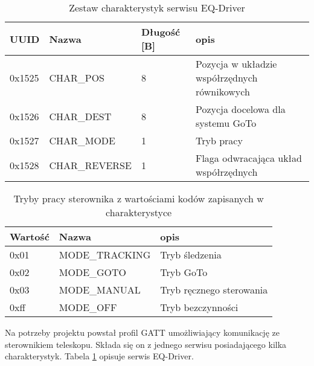 \begin{table}[t]

\begin{tabularx}{\linewidth}{|l|l|l|X|}

\hline UUID & Nazwa & Długość [B] & opis \\

\hline 0x1525 & CHAR\_POS & 8 & Pozycja w układzie współrzędnych równikowych \\

\hline 0x1526 & CHAR\_DEST & 8 & Pozycja docelowa dla systemu GoTo \\

\hline 0x1527 & CHAR\_MODE & 1 & Tryb pracy \\

\hline 0x1528 & CHAR\_REVERSE & 1 & Flaga odwracająca układ współrzędnych \\

\hline \end{tabularx}

\caption{Zestaw charakterystyk serwisu EQ-Driver}

\label{tab:eq-driver-service}

\end{table}

\begin{table}[t]

\begin{tabularx}{\linewidth}{|l|l|X|}

\hline Wartość & Nazwa &  opis \\

\hline 0x01 & MODE\_TRACKING & Tryb śledzenia \\

\hline 0x02 & MODE\_GOTO & Tryb GoTo \\

\hline 0x03 & MODE\_MANUAL & Tryb ręcznego sterowania \\

\hline 0xff & MODE\_OFF & Tryb bezczynności \\

\hline \end{tabularx}

\caption{Tryby pracy sterownika z wartościami kodów zapisanych
w charakterystyce}

\label{tab:eq-driver-modes}

\end{table}

Na potrzeby projektu powstał profil GATT umożliwiający komunikację ze
sterownikiem teleskopu. Składa się on z jednego serwisu posiadającego kilka
charakterystyk. Tabela \ref{tab:eq-driver-service} opisuje serwis EQ-Driver.

